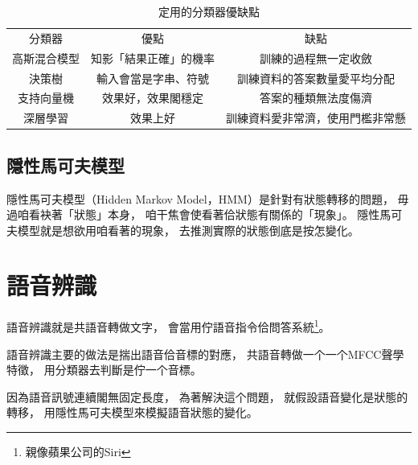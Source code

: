 \begin{table}
\caption{定用的分類器優缺點}
\label{表：定用的分類器優缺點}
\centering
\begin{tabular}{ccc}
分類器 & 優點 & 缺點 \\
高斯混合模型 & 知影「結果正確」的機率 & 訓練的過程無一定收斂 \\
決策樹 & 輸入會當是字串、符號 & 訓練資料的答案數量愛平均分配\\
支持向量機 & 效果好，效果閣穩定 & 答案的種類無法度傷濟\\
深層學習 & 效果上好 & 訓練資料愛非常濟，使用門檻非常懸\\
\end{tabular}
\end{table}
%
%

\subsection{隱性馬可夫模型}
\label{小節：隱性馬可夫模型}
隱性馬可夫模型（Hidden Markov Model，HMM）是針對有狀態轉移的問題，
毋過咱看袂著「狀態」本身，
咱干焦會使看著佮狀態有關係的「現象」。
隱性馬可夫模型就是想欲用咱看著的現象，
去推測實際的狀態倒底是按怎變化。



\section{語音辨識}
\label{節：語音辨識}
語音辨識就是共語音轉做文字，
會當用佇語音指令佮問答系統\footnote{親像蘋果公司的Siri}。

語音辨識主要的做法是揣出語音佮音標的對應，
共語音轉做一个一个MFCC聲學特徵，
用分類器去判斷是佇一个音標。

因為語音訊號連續閣無固定長度，
為著解決這个問題，
就假設語音變化是狀態的轉移，
用隱性馬可夫模型來模擬語音狀態的變化。

